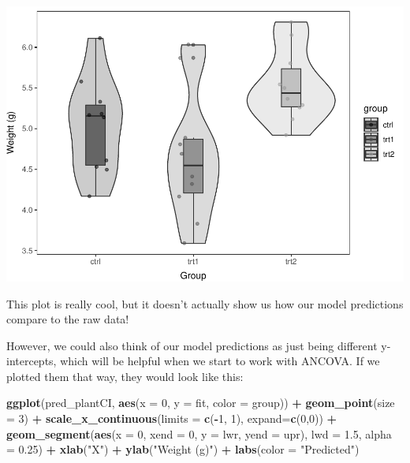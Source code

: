 \documentclass[
]{book}
\newenvironment{Shaded}{\begin{snugshade}}{\end{snugshade}}
\newcommand{\DataTypeTok}[1]{\textcolor[rgb]{0.13,0.29,0.53}{#1}}
\newcommand{\DecValTok}[1]{\textcolor[rgb]{0.00,0.00,0.81}{#1}}
\newcommand{\FloatTok}[1]{\textcolor[rgb]{0.00,0.00,0.81}{#1}}
\newcommand{\KeywordTok}[1]{\textcolor[rgb]{0.13,0.29,0.53}{\textbf{#1}}}
\newcommand{\NormalTok}[1]{#1}
\newcommand{\OperatorTok}[1]{\textcolor[rgb]{0.81,0.36,0.00}{\textbf{#1}}}
\newcommand{\StringTok}[1]{\textcolor[rgb]{0.31,0.60,0.02}{#1}}
\begin{document}
\includegraphics{worstr_files/figure-latex/unnamed-chunk-258-1.pdf}

This plot is really cool, but it doesn't actually show us how our model predictions compare to the raw data!

However, we could also think of our model predictions as just being different y-intercepts, which will be helpful when we start to work with ANCOVA. If we plotted them that way, they would look like this:

\begin{Shaded}
\begin{Highlighting}[]
\KeywordTok{ggplot}\NormalTok{(pred_plantCI, }\KeywordTok{aes}\NormalTok{(}\DataTypeTok{x =} \DecValTok{0}\NormalTok{, }\DataTypeTok{y =}\NormalTok{ fit, }\DataTypeTok{color =}\NormalTok{ group)) }\OperatorTok{+}
\StringTok{  }\KeywordTok{geom_point}\NormalTok{(}\DataTypeTok{size =} \DecValTok{3}\NormalTok{) }\OperatorTok{+}\StringTok{ }
\StringTok{  }\KeywordTok{scale_x_continuous}\NormalTok{(}\DataTypeTok{limits =} \KeywordTok{c}\NormalTok{(}\OperatorTok{-}\DecValTok{1}\NormalTok{,  }\DecValTok{1}\NormalTok{), }\DataTypeTok{expand=}\KeywordTok{c}\NormalTok{(}\DecValTok{0}\NormalTok{,}\DecValTok{0}\NormalTok{)) }\OperatorTok{+}
\StringTok{  }\KeywordTok{geom_segment}\NormalTok{(}\KeywordTok{aes}\NormalTok{(}\DataTypeTok{x =} \DecValTok{0}\NormalTok{, }\DataTypeTok{xend =} \DecValTok{0}\NormalTok{, }\DataTypeTok{y =}\NormalTok{ lwr, }\DataTypeTok{yend =}\NormalTok{ upr),}
               \DataTypeTok{lwd =} \FloatTok{1.5}\NormalTok{, }\DataTypeTok{alpha =} \FloatTok{0.25}\NormalTok{) }\OperatorTok{+}
\StringTok{  }\KeywordTok{xlab}\NormalTok{(}\StringTok{"X"}\NormalTok{) }\OperatorTok{+}
\StringTok{  }\KeywordTok{ylab}\NormalTok{(}\StringTok{"Weight (g)"}\NormalTok{) }\OperatorTok{+}\StringTok{ }
\StringTok{  }\KeywordTok{labs}\NormalTok{(}\DataTypeTok{color =} \StringTok{"Predicted"}\NormalTok{)}
\end{Highlighting}
\end{Shaded}
\end{document}
